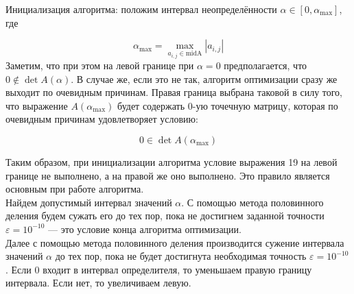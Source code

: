 \documentclass[a4paper,12pt]{article}
\begin{document}
    \item Инициализация алгоритма: положим интервал неопределённости \( \alpha \in [0, \alpha_{\text{max}}] \), где
    
\[
    \alpha_{\text{max}} = \max_{a_{i,j} \in \text{midA}} |a_{i,j}| \tag{15}
    \]
    Заметим, что при этом на левой границе при \( \alpha = 0 \) предполагается, что \( 0 \notin \det A(\alpha) \). В случае же, если это не так, алгоритм оптимизации сразу же выходит по очевидным причинам. Правая граница выбрана таковой в силу того, что выражение \( A(\alpha_{\text{max}}) \) будет содержать 0-ую точечную матрицу, которая по очевидным причинам удовлетворяет условию:
    
\[
0 \in \det A(\alpha_{\text{max}}) \tag{16}
\] 

Таким образом, при инициализации алгоритма условие выражения 19 на левой границе не выполнено, а на правой же оно выполнено. Это правило является основным при работе алгоритма. \\


Найдем допустимый интервал значений \(\alpha\). С помощью метода половинного деления будем сужать его до тех пор, пока не достигнем заданной точности \(\varepsilon = 10^{-10}\) — это условие конца алгоритма оптимизации. \\

Далее с помощью метода половинного деления производится сужение интервала значений \(\alpha\) до тех пор, пока не будет достигнута необходимая точность \(\varepsilon = 10^{-10}\). Если \(0\) входит в интервал определителя, то уменьшаем правую границу интервала. Если нет, то увеличиваем левую.
\end{document}
